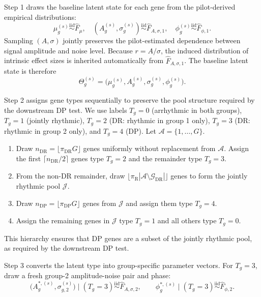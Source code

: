 \documentclass{article}
\begin{document}
Step 1 draws the baseline latent state for each gene from the pilot-derived
empirical distributions:
\begin{equation}
\mu_g^{(s)} \overset{\mathrm{iid}}{\sim}\hat{F}_\mu,\quad
(A_g^{(s)},\sigma_g^{(s)}) \overset{\mathrm{iid}}{\sim}\hat{F}_{A,\sigma,1},\quad
\phi_g^{(s)} \overset{\mathrm{iid}}{\sim}\hat{F}_{\phi,1}.
\label{eq:layer1}
\end{equation}
Sampling $(A,\sigma)$ jointly preserves the pilot-estimated dependence between
signal amplitude and noise level. Because $r=A/\sigma$, the induced
distribution of intrinsic effect sizes is inherited automatically from
$\hat{F}_{A,\sigma,1}$.
The baseline latent state is therefore
\[
\Theta_g^{(s)}=\bigl(\mu_g^{(s)},A_g^{(s)},\sigma_g^{(s)},\phi_g^{(s)}\bigr).
\]

Step 2 assigns gene types sequentially to preserve the pool structure required by
the downstream DP test. We use labels $T_g=0$ (arrhythmic in both groups),
$T_g=1$ (jointly rhythmic), $T_g=2$ (DR: rhythmic in group 1 only),
$T_g=3$ (DR: rhythmic in group 2 only), and $T_g=4$ (DP). Let
$\mathcal{A}=\{1,\ldots,G\}$.

\begin{enumerate}
\item Draw $n_{\mathrm{DR}}=\lfloor\pi_{\mathrm{DR}}G\rfloor$ genes uniformly
without replacement from $\mathcal{A}$. Assign the first
$\lceil n_{\mathrm{DR}}/2\rceil$ genes type $T_g=2$ and the remainder type
$T_g=3$.
\item From the non-DR remainder, draw
$\lfloor\pi_{\mathrm{R}}|\mathcal{A}\setminus\mathcal{G}_{\mathrm{DR}}|\rfloor$
genes to form the jointly rhythmic pool $\mathcal{J}$.
\item Draw $n_{\mathrm{DP}}=\lfloor\pi_{\mathrm{DP}}G\rfloor$ genes from
$\mathcal{J}$ and assign them type
$T_g=4$.
\item Assign the remaining genes in $\mathcal{J}$ type $T_g=1$ and all others
type $T_g=0$.
\end{enumerate}

This hierarchy ensures that DP genes are a subset of the jointly rhythmic pool,
as required by the downstream DP test.

Step 3 converts the latent type into group-specific parameter vectors. For
$T_g=3$, draw a fresh group-2 amplitude-noise pair and phase:
\begin{equation}
\bigl(A_g^{*,(s)},\sigma_{g,2}^{(s)}\bigr) \mid (T_g=3)
\overset{\mathrm{iid}}{\sim}\hat{F}_{A,\sigma,2},
\qquad
\phi_g^{*,(s)} \mid (T_g=3)\overset{\mathrm{iid}}{\sim}\hat{F}_{\phi,2}.
\label{eq:layer3a}
\end{equation}
\end{document}
